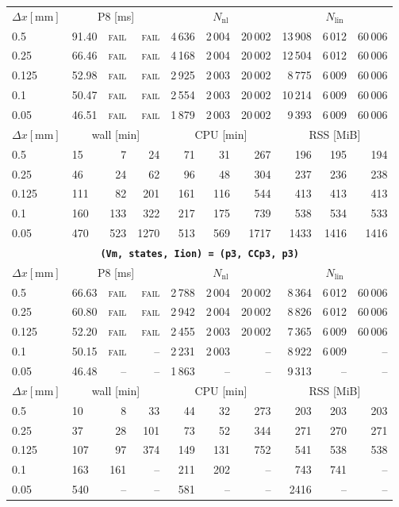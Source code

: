 \documentclass[11pt,a4paper]{article}
\newcommand{\code}[1]{\texttt{\small #1}}
\begin{document}
\begin{center}
\begin{longtable}{l|lrr|rrr|rrr}
$ \Delta x [\text{mm}] $ & \multicolumn{3}{c|}{P8 [ms]} & \multicolumn{3}{c|}{$N_{\mathrm{nl}}$} & \multicolumn{3}{c|}{$N_{\mathrm{lin}}$}\\
0.5 & 91.40 & \textsc{fail} & \textsc{fail} & 4\,636 & 2\,004 & 20\,002 & 13\,908 & 6\,012 & 60\,006\\
0.25 & 66.46 & \textsc{fail} & \textsc{fail} & 4\,168 & 2\,004 & 20\,002 & 12\,504 & 6\,012 & 60\,006\\
0.125 & 52.98 & \textsc{fail} & \textsc{fail} & 2\,925 & 2\,003 & 20\,002 & 8\,775 & 6\,009 & 60\,006\\
0.1 & 50.47 & \textsc{fail} & \textsc{fail} & 2\,554 & 2\,003 & 20\,002 & 10\,214 & 6\,009 & 60\,006\\
0.05 & 46.51 & \textsc{fail} & \textsc{fail} & 1\,879 & 2\,003 & 20\,002 & 9\,393 & 6\,009 & 60\,006\\
\hline
$ \Delta x [\text{mm}] $ & \multicolumn{3}{c|}{wall [min]} & \multicolumn{3}{c|}{CPU [min]} & \multicolumn{3}{c|}{RSS [MiB]}\\
0.5 & 15 & 7 & 24 & 71 & 31 & 267 & 196 & 195 & 194\\
0.25 & 46 & 24 & 62 & 96 & 48 & 304 & 237 & 236 & 238\\
0.125 & 111 & 82 & 201 & 161 & 116 & 544 & 413 & 413 & 413\\
0.1 & 160 & 133 & 322 & 217 & 175 & 739 & 538 & 534 & 533\\
0.05 & 470 & 523 & 1270 & 513 & 569 & 1717 & 1433 & 1416 & 1416\\
\hline
\hline
\multicolumn{10}{c}{\textbf{\code{(Vm, states, Iion) = (p3, CCp3, p3)}}}\\\hline
$ \Delta x [\text{mm}] $ & \multicolumn{3}{c|}{P8 [ms]} & \multicolumn{3}{c|}{$N_{\mathrm{nl}}$} & \multicolumn{3}{c|}{$N_{\mathrm{lin}}$}\\
0.5 & 66.63 & \textsc{fail} & \textsc{fail} & 2\,788 & 2\,004 & 20\,002 & 8\,364 & 6\,012 & 60\,006\\
0.25 & 60.80 & \textsc{fail} & \textsc{fail} & 2\,942 & 2\,004 & 20\,002 & 8\,826 & 6\,012 & 60\,006\\
0.125 & 52.20 & \textsc{fail} & \textsc{fail} & 2\,455 & 2\,003 & 20\,002 & 7\,365 & 6\,009 & 60\,006\\
0.1 & 50.15 & \textsc{fail} & -- & 2\,231 & 2\,003 & -- & 8\,922 & 6\,009 & --\\
0.05 & 46.48 & -- & -- & 1\,863 & -- & -- & 9\,313 & -- & --\\
\hline
$ \Delta x [\text{mm}] $ & \multicolumn{3}{c|}{wall [min]} & \multicolumn{3}{c|}{CPU [min]} & \multicolumn{3}{c|}{RSS [MiB]}\\
0.5 & 10 & 8 & 33 & 44 & 32 & 273 & 203 & 203 & 203\\
0.25 & 37 & 28 & 101 & 73 & 52 & 344 & 271 & 270 & 271\\
0.125 & 107 & 97 & 374 & 149 & 131 & 752 & 541 & 538 & 538\\
0.1 & 163 & 161 & -- & 211 & 202 & -- & 743 & 741 & --\\
0.05 & 540 & -- & -- & 581 & -- & -- & 2416 & -- & --\\
\hline
\bottomrule\end{longtable}\end{center}
\end{document}
